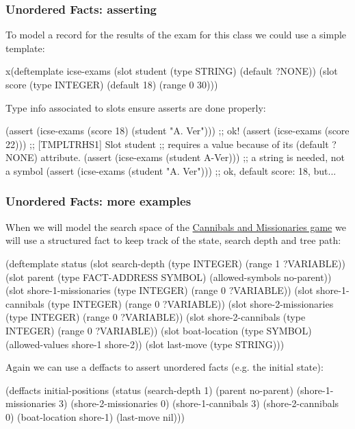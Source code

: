 \documentclass[xcolor={usenames,dvipsnames,svgnames}, compress]{beamer}
\begin{document}
\begin{frame}[fragile]
  \frametitle{Unordered Facts: asserting}
  To model a record for the results of the exam for this class we
  could use a simple template:
  \begin{clips-code}[numbers=none]
    x(deftemplate icse-exams
        (slot student
            (type STRING)
            (default ?NONE))
        (slot score
            (type INTEGER)
            (default 18)
            (range 0 30)))
  \end{clips-code}
  
  Type info associated to slots ensure asserts are done properly:
  \begin{clips-code}[numbers=none]
    (assert (icse-exams (score 18) (student "A. Ver"))) ;; ok!
    (assert (icse-exams (score 22))) ;; [TMPLTRHS1] Slot student
    ;; requires a value because of its (default ?NONE) attribute.
    (assert (icse-exams (student A-Ver))) ;; a string is needed, not a symbol
    (assert (icse-exams (student "A. Ver"))) ;; ok, default score: 18, but...
  \end{clips-code}
  
\end{frame}

\begin{frame}[fragile]
  \frametitle{Unordered Facts: more examples}
  When we will model the search space of the \href{http://en.wikipedia.org/wiki/Missionaries_and_cannibals_problem}{Cannibals and Missionaries game} we will use a structured
  fact to keep track of the state, search depth and tree path:
  \begin{clips-code}[numbers=none]
    (deftemplate status 
        (slot search-depth (type INTEGER) (range 1 ?VARIABLE))
        (slot parent (type FACT-ADDRESS SYMBOL) (allowed-symbols no-parent))
        (slot shore-1-missionaries (type INTEGER) (range 0 ?VARIABLE))
        (slot shore-1-cannibals (type INTEGER) (range 0 ?VARIABLE))
        (slot shore-2-missionaries (type INTEGER) (range 0 ?VARIABLE))
        (slot shore-2-cannibals (type INTEGER) (range 0 ?VARIABLE))
        (slot boat-location (type SYMBOL) (allowed-values shore-1 shore-2))
        (slot last-move (type STRING)))
  \end{clips-code}
  
  Again we can use a \textsf{deffacts} to assert unordered facts
  (e.g. the
  initial state):
  \begin{clips-code}[numbers=none]
    (deffacts initial-positions
        (status (search-depth 1) 
            (parent no-parent) (shore-1-missionaries 3)
            (shore-2-missionaries 0) (shore-1-cannibals 3)
            (shore-2-cannibals 0) (boat-location shore-1) (last-move
            nil)))
          \end{clips-code}
\end{frame}
\end{document}
